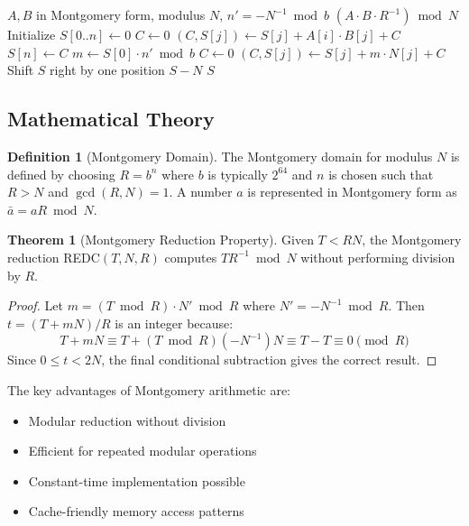 \documentclass[12pt,a4paper]{article}
\theoremstyle{definition}
\newtheorem{definition}{Definition}[section]
\newtheorem{theorem}{Theorem}[section]
\begin{document}
\begin{algorithm}[H]
\caption{Montgomery Multiplication (CIOS)}
\label{alg:cios}
\begin{algorithmic}[1]
\REQUIRE $A, B$ in Montgomery form, modulus $N$, $n' = -N^{-1} \bmod b$
\ENSURE $(A \cdot B \cdot R^{-1}) \bmod N$
\STATE Initialize $S[0..n] \leftarrow 0$
    \STATE $C \leftarrow 0$
        \STATE $(C, S[j]) \leftarrow S[j] + A[i] \cdot B[j] + C$
    \ENDFOR
    \STATE $S[n] \leftarrow C$
    \STATE $m \leftarrow S[0] \cdot n' \bmod b$
    \STATE $C \leftarrow 0$
        \STATE $(C, S[j]) \leftarrow S[j] + m \cdot N[j] + C$
    \ENDFOR
    \STATE Shift $S$ right by one position
\ENDFOR
{}
    \RETURN $S - N$
\ELSE
    \RETURN $S$
\ENDIF
\end{algorithmic}
\end{algorithm}

\subsection{Mathematical Theory}

\begin{definition}[Montgomery Domain]
The Montgomery domain for modulus $N$ is defined by choosing $R = b^n$ where $b$ is typically $2^{64}$ and $n$ is chosen such that $R > N$ and $\gcd(R, N) = 1$. A number $a$ is represented in Montgomery form as $\bar{a} = aR \bmod N$.
\end{definition}

\begin{theorem}[Montgomery Reduction Property]
Given $T < RN$, the Montgomery reduction REDC$(T, N, R)$ computes $TR^{-1} \bmod N$ without performing division by $R$.
\end{theorem}

\begin{proof}
Let $m = (T \bmod R) \cdot N' \bmod R$ where $N' = -N^{-1} \bmod R$.
Then $t = (T + mN)/R$ is an integer because:
\[T + mN \equiv T + (T \bmod R)(-N^{-1})N \equiv T - T \equiv 0 \pmod{R}\]
Since $0 \leq t < 2N$, the final conditional subtraction gives the correct result.
\end{proof}

The key advantages of Montgomery arithmetic are:
\begin{itemize}
    \item Modular reduction without division
    \item Efficient for repeated modular operations
    \item Constant-time implementation possible
    \item Cache-friendly memory access patterns
\end{itemize}
\end{document}
